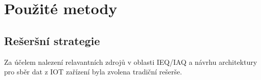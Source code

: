 \section*{Použité metody}

\subsection*{Rešeršní strategie}

Za účelem nalezení relavantních zdrojů v oblasti IEQ/IAQ a návrhu architektury pro sběr dat z IOT zařízení byla zvolena tradiční rešerše.
